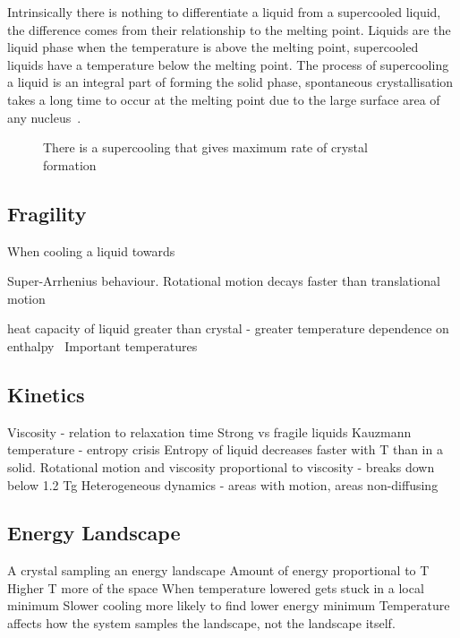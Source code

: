 Intrinsically there is nothing to differentiate a liquid from a supercooled liquid, the difference comes from their relationship to the melting point. Liquids are the liquid phase when the temperature is above the melting point, supercooled liquids have a temperature below the melting point. The process of supercooling a liquid is an integral part of forming the solid phase, spontaneous crystallisation takes a long time to occur at the melting point due to the large surface area of any nucleus~.

\begin{figure}
    \caption{There is a supercooling that gives maximum rate of crystal formation}
    \label{fig:supercool crys}
\end{figure}


\subsection{Fragility}
When cooling a liquid towards  

Super-Arrhenius behaviour.
Rotational motion decays faster than translational motion


\begin{figure}
\end{figure}
heat capacity of liquid greater than crystal - greater temperature dependence on enthalpy~\cite{debenedetti:01}
Important temperatures

\subsection{Kinetics}
Viscosity - relation to relaxation time
Strong vs fragile liquids
Kauzmann temperature - entropy crisis
Entropy of liquid decreases faster with T than in a solid.
Rotational motion and viscosity proportional to viscosity - breaks down below 1.2 Tg
Heterogeneous dynamics - areas with motion, areas non-diffusing

\subsection{Energy Landscape}
A crystal sampling an energy landscape
Amount of energy proportional to T
Higher T more of the space
When temperature lowered gets stuck in a local minimum
Slower cooling more likely to find lower energy minimum
Temperature affects how the system samples the landscape, not the landscape itself.


